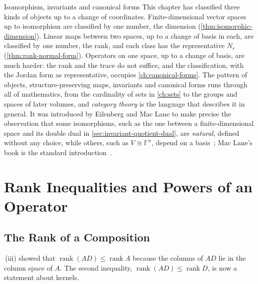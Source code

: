 \begin{note}{Isomorphism, invariants and canonical forms}
This chapter has classified three kinds of objects up to a change of coordinates. Finite-dimensional vector spaces up to isomorphism are classified by one number, the dimension (\cref{thm:isomorphic-dimension}). Linear maps between two spaces, up to a change of basis in each, are classified by one number, the rank, and each class has the representative $N_r$ (\cref{thm:rank-normal-form}). Operators on one space, up to a change of basis, are much harder: the rank and the trace do not suffice, and the classification, with the Jordan form as representative, occupies \cref{ch:canonical-forms}. The pattern of objects, structure-preserving maps, invariants and canonical forms runs through all of mathematics, from the cardinality of sets in \cref{ch:sets} to the groups and spaces of later volumes, and \emph{category theory} is the language that describes it in general. It was introduced by Eilenberg and Mac Lane to make precise the observation that some isomorphisms, such as the one between a finite-dimensional space and its double dual in \cref{sec:invariant-quotient-dual}, are \emph{natural}, defined without any choice, while others, such as $V\cong\mathbb F^n$, depend on a basis~\cite{eilenberg1945}; Mac Lane's book is the standard introduction~\cite{maclane1998}.
\end{note}

\section{Rank Inequalities and Powers of an Operator}
\label{sec:rank-inequalities}

\subsection{The Rank of a Composition}

\,(iii) showed that $\operatorname{rank}(AD)\le\operatorname{rank}A$ because the columns of $AD$ lie in the column space of $A$. The second inequality, $\operatorname{rank}(AD)\le\operatorname{rank}D$, is now a statement about kernels.


